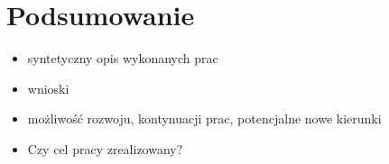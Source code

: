 \documentclass[a4paper,twoside,12pt]{book}
\begin{document}
	
	
	\chapter{Podsumowanie}
	
	
	\begin{itemize}
		\item syntetyczny opis wykonanych prac
		\item wnioski
		\item możliwość rozwoju, kontynuacji prac, potencjalne nowe kierunki
		\item Czy cel pracy zrealizowany? 
	\end{itemize}
	
	
	
	\backmatter
	
	\cleardoublepage
	\printbibliography           %
	
\end{document}

